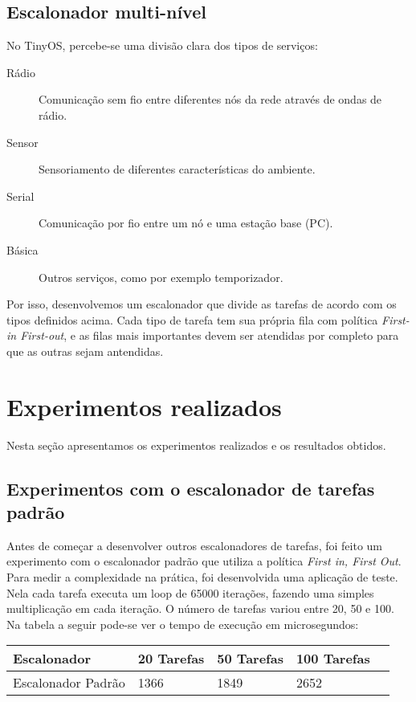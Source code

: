 \documentclass[a4paper,onecolumn, 10pt]{article}
\begin{document}
\subsection{Escalonador multi-nível}
No TinyOS, percebe-se uma divisão clara dos tipos de serviços: 
\begin{description}
    \item[Rádio] Comunicação sem fio entre diferentes nós da rede através de ondas de rádio.
    \item[Sensor] Sensoriamento de diferentes características do ambiente.
    \item[Serial] Comunicação por fio entre um nó e uma estação base (PC).
    \item[Básica] Outros serviços, como por exemplo temporizador.
\end{description}
Por isso, desenvolvemos um escalonador que divide as tarefas de acordo com os tipos definidos acima.
Cada tipo de tarefa tem sua própria fila com política \textit{First-in First-out}, e as filas mais importantes devem ser
atendidas por completo para que as outras sejam antendidas.


\section{Experimentos realizados}\label{resultados}
Nesta seção apresentamos os experimentos realizados e os resultados obtidos.

\subsection{Experimentos com o escalonador de tarefas padrão}
Antes de começar a desenvolver outros escalonadores de tarefas, foi feito um experimento com o escalonador 
padrão que utiliza a política \textit{First in, First Out}.
Para medir a complexidade na prática, foi desenvolvida uma aplicação de teste. Nela cada tarefa executa um loop de 65000
iterações, fazendo uma simples multiplicação em cada iteração. O número de tarefas variou entre 20, 50 e 100.
Na tabela a seguir pode-se ver o tempo de execução em microsegundos:
\begin{center}
    \begin{tabular}{ | l | l | l | l | p{5cm} |}
    \hline
    Escalonador              & 20 Tarefas & 50 Tarefas & 100 Tarefas \\ \hline
    Escalonador Padrão       & 1366 & 1849 & 2652 \\ \hline
    \end{tabular}
\end{center}
\end{document}
